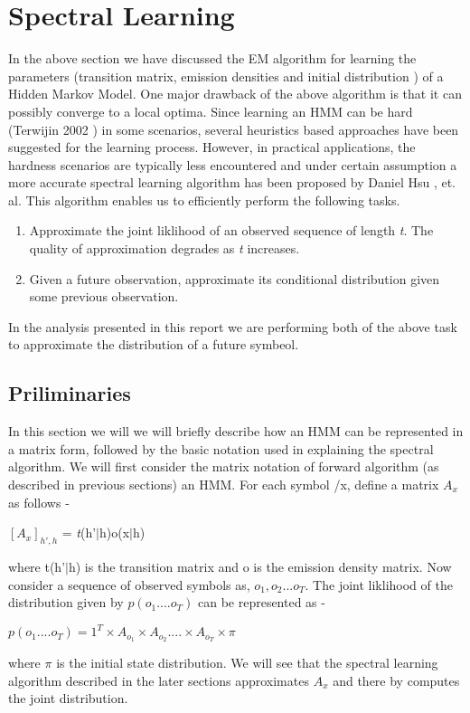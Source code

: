 \documentclass{article} %
\begin{document}
\section{Spectral Learning}
\label{Spectral Learning}

In the above section we have discussed the EM algorithm for learning the parameters (transition matrix, emission densities and initial distribution ) of a Hidden Markov Model. One major drawback of the above algorithm is that it can possibly converge to a local optima. Since learning an HMM can be hard (Terwijin 2002 ) in some scenarios, several heuristics based approaches have been suggested for the learning process. However, in practical applications, the hardness scenarios are typically less encountered and under certain assumption a more accurate spectral learning algorithm has been proposed by Daniel Hsu , et. al.  This algorithm enables us to efficiently perform the following tasks.
\begin{enumerate}
	\item Approximate the joint liklihood of an observed sequence of length \textit{t}. The quality of approximation degrades as \textit{t} increases.
	\item Given a future observation, approximate its conditional distribution given some previous observation. 
\end{enumerate}
In the analysis presented in this report we are performing both of the above task to approximate the distribution of a future symbeol.
\subsection{Priliminaries}
In this section we will we will briefly describe how an HMM can be represented in a matrix form, followed by the basic notation used in explaining the spectral algorithm. 
\newline
We will first consider the matrix notation of forward algorithm (as described in previous sections) an HMM. For each symbol /x, define a matrix $A_x$ as follows -
\begin{center}
$[A_x]_{h',h}$ = \textit{t}(h'$\vert$h)o(x$\vert$h) 
\end{center}
 
where t(h'$\vert$h) is the transition matrix and o is the emission density matrix.
Now consider a sequence of observed symbols as, $o_1,o_2...o_T$. The joint liklihood of the distribution given by $p(o_1....o_T)$ can be represented as -
\begin{center}
$p(o_1....o_T) = 1^T \times A_{o_1} \times A_{o_2} . . . . \times A_{o_T} \times \pi$
\end{center}
where $\pi$ is the initial state distribution. We will see that the spectral learning algorithm described in the later sections approximates $A_x$ and there by computes the joint distribution.
\end{document}
